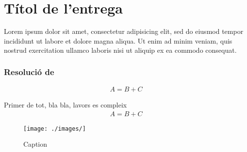 \setcounter{section}{0}
\setcounter{page}{1}
\section{Títol de l'entrega} %
Lorem ipsum dolor sit amet, consectetur adipisicing elit, sed do eiusmod tempor incididunt ut labore et dolore magna aliqua. Ut enim ad minim veniam, quis nostrud exercitation ullamco laboris nisi ut aliquip ex ea commodo consequat.

\subsubsection*{Resolució de }
\begin{align*}
	\boxed{ A = B + C }
\end{align*}
\begin{sproof}
	Primer de tot, bla bla, lavors es compleix
	\begin{align}
		A = B + C
	\end{align}
\end{sproof}

\begin{figure}[H]
	\centering
	\texttt{[image: ./images/]}
	\caption{Caption}
	\label{fig:}
\end{figure}
